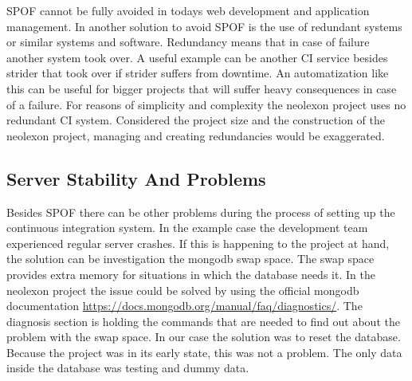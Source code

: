 SPOF cannot be fully avoided in todays web development and application management. In \cite{ulbrich2012eliminating} another solution to avoid SPOF is
the use of redundant systems or similar systems and software. Redundancy means that in case of failure another system took over. A useful example
can be another CI service besides strider that took over if strider suffers from downtime. An automatization like this can be useful for bigger
projects that will suffer heavy consequences in case of a failure. For reasons of simplicity and complexity the neolexon project uses no redundant
CI system. Considered the project size and the construction of the neolexon project, managing and creating redundancies would be exaggerated.

\subsection{Server Stability And Problems}
\label{section:Server Stability And Problems}
Besides SPOF there can be other problems during the process of setting up the continuous integration system. In the example case the development team
experienced regular server crashes. If this is happening to the project at hand, the solution can be investigation the mongodb swap space.
The swap space provides extra memory for situations in which the database needs it. In the neolexon project the issue could be solved by using the official
mongodb documentation \url{https://docs.mongodb.org/manual/faq/diagnostics/}. The diagnosis section is holding the commands that are needed to find out about the problem with the swap space. In our case
the solution was to reset the database. Because the project was in its early state, this was not a problem. The only data inside the database was testing and
dummy data.

\newpage
